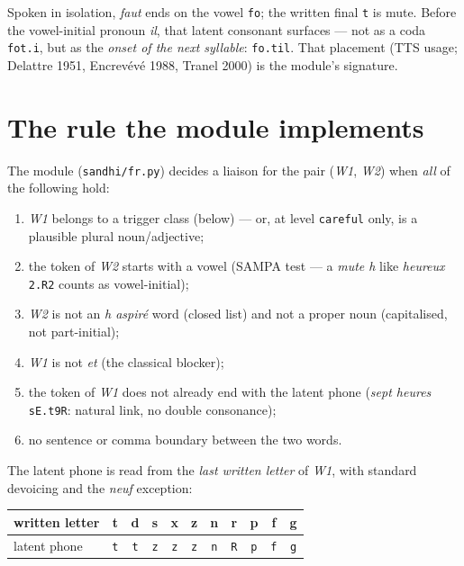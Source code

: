 \documentclass[11pt,a4paper]{report}
\newcommand{\smp}[1]{\texttt{#1}}          %
\begin{document}
\noindent Spoken in isolation, \emph{faut} ends on the vowel \smp{fo}; the
written final \smp{t} is mute. Before the vowel-initial pronoun \emph{il},
that latent consonant surfaces — not as a coda \smp{fot.i}, but as the
\emph{onset of the next syllable}: \smp{fo.til}. That placement (TTS usage;
Delattre 1951, Encrev\'ev\'e 1988, Tranel 2000) is the module's signature.

\section{The rule the module implements}

The module (\smp{sandhi/fr.py}) decides a liaison for the pair
(\emph{W1}, \emph{W2}) when \emph{all} of the following hold:

\begin{enumerate}
  \item \emph{W1} belongs to a trigger class (below) — or, at level
        \smp{careful} only, is a plausible plural noun/adjective;
  \item the token of \emph{W2} starts with a vowel (SAMPA test — a
        \emph{mute h} like \emph{heureux} \smp{2.R2} counts as vowel-initial);
  \item \emph{W2} is not an \emph{h aspir\'e} word (closed list) and not a
        proper noun (capitalised, not part-initial);
  \item \emph{W1} is not \emph{et} (the classical blocker);
  \item the token of \emph{W1} does not already end with the latent phone
        (\emph{sept heures} \smp{sE.t9R}: natural link, no double
        consonance);
  \item no sentence or comma boundary between the two words.
\end{enumerate}

The latent phone is read from the \emph{last written letter} of \emph{W1},
with standard devoicing and the \emph{neuf} exception:

\begin{center}
\begin{tabular}{@{}lcccccccccc@{}}
\toprule
written letter & t & d & s & x & z & n & r & p & f & g \\
\midrule
latent phone & \smp{t} & \smp{t} & \smp{z} & \smp{z} & \smp{z} & \smp{n} &
\smp{R} & \smp{p} & \smp{f} & \smp{g} \\
\bottomrule
\end{tabular}
\end{center}
\end{document}
